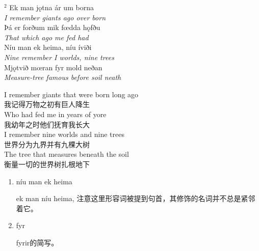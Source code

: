 \begin{paracol}{2}
    \noindent
    $^2 $ Ek man jǫtna ár um borna\\
    \textit{I remember giants ago over born}\\
    Þá er forðum mik fœdda hǫfðu\\
    \textit{That which ago me fed had}\\
    Níu man ek heima, níu íviði\\
    \textit{Nine remember I worlds, nine trees}\\
    Mjǫtvið mœran fyr mold neðan\\
    \textit{Measure-tree famous before soil neath}\\
    \switchcolumn

    \noindent
    I remember giants that were born long ago\\
    我记得万物之初有巨人降生\\
    Who had fed me in years of yore\\
    我幼年之时他们抚育我长大\\
    I remember nine worlds and nine trees\\
    世界分为九界并有九棵大树\\
    The tree that measures beneath the soil\\
    衡量一切的世界树扎根地下\\

\end{paracol}

\begin{grammar*}{}
    \begin{enumerate}[leftmargin=*]
        \item níu man ek heima

              ek man níu heima, 注意这里形容词被提到句首，其修饰的名词并不总是紧邻着它。

        \item fyr

              fyrir的简写。
    \end{enumerate}
\end{grammar*}
\medskip %

